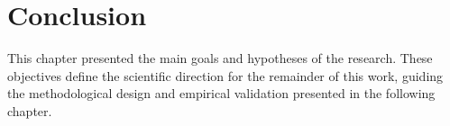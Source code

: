 \section{Conclusion}
\label{sec:research_objectives_conclusion}

This chapter presented the main goals and hypotheses of the research.  
These objectives define the scientific direction for the remainder of 
this work, guiding the methodological design and empirical validation 
presented in the following chapter.